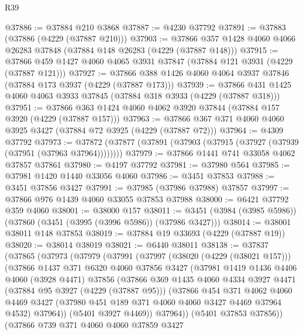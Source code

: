 \begin{lexlean}{R39}
\begin{coremodule}
@37886 := @37884 @210 @3868
@37887 := @4230 @37792
@37891 := @37883 (@37886 (@4229 (@37887 @210)))
@37903 := @37866 @357 @1428 @4060 @4066 @26283 @37848 (@37884 @148 @26283 (@4229 (@37887 @148)))
@37915 := @37866 @459 @1427 @4060 @4065 @3931 @37847 (@37884 @121 @3931 (@4229 (@37887 @121)))
@37927 := @37866 @388 @1426 @4060 @4064 @3937 @37846 (@37884 @173 @3937 (@4229 (@37887 @173)))
@37939 := @37866 @431 @1425 @4060 @4063 @3933 @37845 (@37884 @318 @3933 (@4229 (@37887 @318)))
@37951 := @37866 @363 @1424 @4060 @4062 @3920 @37844 (@37884 @157 @3920 (@4229 (@37887 @157)))
@37963 := @37866 @367 @371 @4060 @4060 @3925 @3427 (@37884 @72 @3925 (@4229 (@37887 @72)))
@37964 := @4309 @37792
@37973 := @37872 (@37877 (@37891 (@37903 (@37915 (@37927 (@37939 (@37951 (@37963 @37964))))))))
@37979 := @37866 @1441 @741 @33058 @4062 @37857 @37861
@37980 := @4197 @37792
@37981 := @37980 @564
@37985 := @37981 @1420 @1440 @33056 @4060
@37986 := @3451 @37853
@37988 := @3451 @37856 @3427
@37991 := @37985 (@37986 @37988) @37857
@37997 := @37866 @976 @1439 @4060 @33055 @37853 @37988
@38000 := @6421 @37792 @359 @4060
@38001 := @38000 @157
@38011 := @3451 (@3984 (@3985 @5986)) (@37860 (@3451 (@3995 (@3996 @5986)) (@37986 @3427)))
@38014 := @38001 @38011 @148 @37853
@38019 := @37884 @19 @33693 (@4229 (@37887 @19))
@38020 := @38014 @38019
@38021 := @6440 @38011
@38138 := @37837
    (@37865
      (@37973
        (@37979
          (@37991
            (@37997
              (@38020 (@4229 (@38021 @157)))
              (@37866
                @1437
                @371
                @6320
                @4060
                @37856
                @3427
                (@37981
                  @1419
                  @1436
                  @4406
                  @4060
                  (@3928 @4471)
                  @37856
                  (@37866
                    @369
                    @1435
                    @4060
                    @4334
                    @3927
                    @4471
                    (@37884 @95 @3927 (@4229 (@37887 @95)))
                    (@37866
                      @454
                      @371
                      @4062
                      @4060
                      @4469
                      @3427
                      (@37980 @451 @189 @371 @4060 @4060 @3427 @4469 @37964 @4532)
                      @37964))
                  (@5401 @3927 @4469))
                @37964))
            (@5401 @37853 @37856))
          (@37866
            @739
            @371
            @4060
            @4060
            @37859
            @3427

\end{coremodule}
\end{lexlean}
